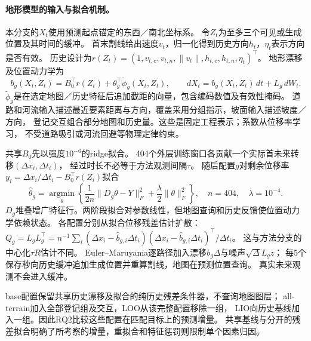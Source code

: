 \paragraph{地形模型的输入与拟合机制。}
本分支的$X_t$使用预测起点锚定的东西／南北坐标系。
令$Z_t$为至多三个可见或生成位置及其时间的缓冲。
首末割线给出速度$v_t$，归一化得到历史方向$h_t$，$\eta_t$表示方向是否有效。
历史设计为$r(Z_t)=(1,v_{t,e},v_{t,n},\|v_t\|,h_{t,e},h_{t,n},\eta_t)^\top$。
地形漂移及位置动力学为
\begin{equation}\label{eq:main-terrain-model}
 b_g(X_t,Z_t)=B_0^\top r(Z_t)+\theta_g^\top\widetilde\phi_g(X_t,Z_t),
 \qquad dX_t=b_g(X_t,Z_t)\,dt+L_g\,dW_t .
\end{equation}
$\widetilde\phi_g$是在选定地图／历史特征后追加截距的向量，包含编码数值及有效性掩码。
道路和河流输入描述最近要素距离与方向，覆盖采用分组指示，坡面输入描述坡度／方向，
登记交互组合部分地图和历史量。这些是固定工程表示；系数从位移率学习，
不受道路吸引或河流回避等物理定律约束。


共享$B_0$先以强度$10^{-6}$的ridge拟合。
404个外层训练窗口各贡献一个实际首未来转移$(\Delta x_i,\Delta t_i)$，
经过时长不必等于方法观测间隔$\tau$。
随后配置$g$对剩余位移率$y_i=\Delta x_i/\Delta t_i-B_0^\top r(Z_i)$拟合
\begin{equation}\label{eq:main-terrain-fit}
 \widehat\theta_g=\underset{\theta}{\operatorname{argmin}}
 \left\{\frac1{2n}\|D_g\theta-Y\|_F^2+
             \frac\lambda2\|\theta\|_F^2\right\},
 \quad n=404,\quad\lambda=10^{-4} .
\end{equation}
$D_g$堆叠增广特征行。两阶段拟合对参数线性，但地图查询和历史反馈使位置动力学依赖状态。
各配置分别从拟合位移残差估计扩散：
$Q_g=L_gL_g^\top=n^{-1}\sum_i
(\Delta x_i-\widehat b_{g,i}\Delta t_i)
(\Delta x_i-\widehat b_{g,i}\Delta t_i)^\top/\Delta t_i$。
这与方法分支的中心化$\tau R$估计不同。
Euler--Maruyama逐路径加入漂移$b_g\Delta$与噪声$\sqrt\Delta L_gz$；
每5个保存秒向历史缓冲追加生成位置并重算割线，地图在预测位置查询。
真实未来观测不会进入缓冲。

base配置保留共享历史漂移及拟合的纯历史残差条件器，不查询地图图层；
all-terrain加入全部登记组及交互，LOO从该完整配置移除一组，
LIO向历史基线加入一组。因此RQ2比较这些配置在匹配目标上的预测增量。
共享基线与分开的残差拟合明确了所考察的增量，重拟合和特征惩罚则限制单个因素归因。
